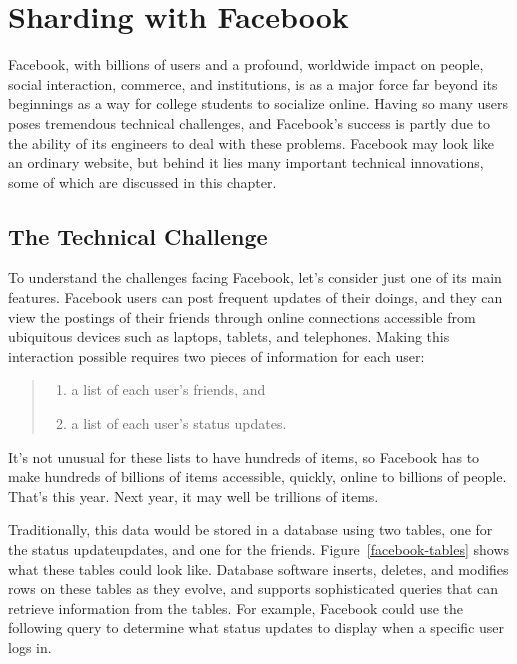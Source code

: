 \chapter{Sharding with Facebook}

Facebook, 
with billions of users and a profound, worldwide impact 
on people, social interaction, commerce, and institutions,
is as a major force far beyond its beginnings
as a way for college students to socialize online.
Having so many users poses tremendous technical challenges, 
and Facebook's success is partly due to
the ability of its engineers to deal with these problems.  
Facebook may look like an ordinary website, 
but behind it lies many important technical innovations,
some of which are discussed in this chapter.

\section{The Technical Challenge}

To understand the challenges facing Facebook, 
let's consider just one of its main features.  
Facebook users can post frequent updates of their doings, 
and they can view the postings of their friends through online connections
accessible from ubiquitous devices such as laptops, tablets, and telephones.
Making this interaction possible requires two pieces of information for each user:
\begin{quote}
\begin{enumerate}
	\item a list of each user's friends, and
	\item a list of each user's status updates.
\end{enumerate}
\end{quote}
It's not unusual for these lists to have hundreds of items, 
so Facebook has to make hundreds of billions of items
accessible, quickly, online to billions of people.
That's this year. Next year, it may well be trillions of items.

Traditionally, this data would be stored in a database 
using two tables, one for the status updateupdates,
and one for the friends.  Figure~\ref{facebook-tables} 
shows what these tables could look like.  
Database software inserts, deletes, and modifies 
rows on these tables as they evolve,
and supports sophisticated queries that can 
retrieve information from the tables.  
For example, Facebook could use the following query to determine 
what status updates to display when a specific user logs in.


